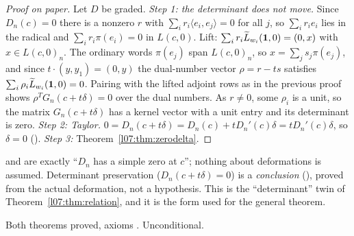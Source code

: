 \begin{proof}[Proof on paper]
Let $D$ be graded. \emph{Step 1: the determinant does not move.} Since $D_n(c) = 0$ there is a nonzero
$r$ with $\sum_ir_i\langle e_i,e_j\rangle = 0$ for all $j$, so $\sum_ir_ie_i$ lies in the radical and
$\sum_ir_i\pi(e_i) = 0$ in $L(c,0)$. Lift: $\sum_ir_i\widetilde L_{w_i}(\mathbf{1},0) = (0,x)$ with $x\in L(c,0)_n$. The
ordinary words $\pi(e_j)$ span $L(c,0)_n$, so $x = \sum_js_j\pi(e_j)$, and since $t\cdot(y,y_1) = (0,y)$ the
dual-number vector $\rho = r - ts$ satisfies $\sum_i\rho_i\widetilde L_{w_i}(\mathbf{1},0) = 0$. Pairing with the lifted
adjoint rows as in the previous proof shows $\rho^{T}G_n(c+t\delta) = 0$ over the dual numbers. As $r\neq0$, some
$\rho_i$ is a unit, so the matrix $G_n(c+t\delta)$ has a kernel vector with a unit entry and its determinant is
zero. \emph{Step 2: Taylor.} $0 = D_n(c+t\delta) = D_n(c) + tD_n'(c)\delta = tD_n'(c)\delta$, so $\delta = 0$
(). \emph{Step 3:} Theorem~\ref{l07:thm:zerodelta}.
\end{proof}

\begin{dictionary}
 and  are exactly ``$D_n$ has a simple zero at $c$''; nothing about deformations is
assumed. Determinant preservation ($D_n(c+t\delta) = 0$) is a \emph{conclusion}
(), proved from the actual deformation, not a hypothesis. This is the
``determinant'' twin of Theorem~\ref{l07:thm:relation}, and it is the form used for the general theorem.
\end{dictionary}

\begin{status}
Both theorems proved, axioms . Unconditional.
\end{status}

